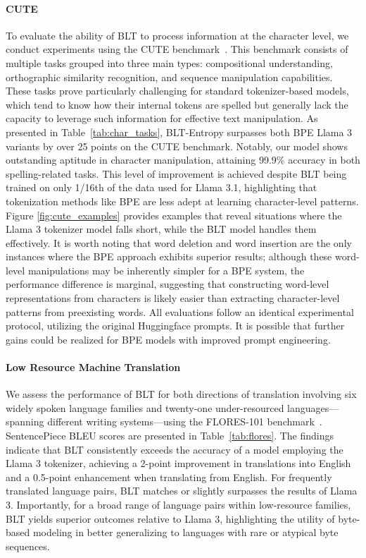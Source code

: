 \paragraph{CUTE}
To evaluate the ability of {\textsc BLT} to process information at the character level, we conduct experiments using the CUTE benchmark~\citep{edman2024cute}. This benchmark consists of multiple tasks grouped into three main types: compositional understanding, orthographic similarity recognition, and sequence manipulation capabilities. These tasks prove particularly challenging for standard tokenizer-based models, which tend to know how their internal tokens are spelled but generally lack the capacity to leverage such information for effective text manipulation. As presented in Table~\ref{tab:char_tasks}, {\textsc BLT}-Entropy surpasses both BPE Llama 3 variants by over 25 points on the CUTE benchmark. Notably, our model shows outstanding aptitude in character manipulation, attaining 99.9\% accuracy in both spelling-related tasks. This level of improvement is achieved despite {\textsc BLT} being trained on only 1/16th of the data used for Llama 3.1, highlighting that tokenization methods like BPE are less adept at learning character-level patterns. Figure \ref{fig:cute_examples} provides examples that reveal situations where the Llama 3 tokenizer model falls short, while the {\textsc BLT} model handles them effectively. It is worth noting that word deletion and word insertion are the only instances where the BPE approach exhibits superior results; although these word-level manipulations may be inherently simpler for a BPE system, the performance difference is marginal, suggesting that constructing word-level representations from characters is likely easier than extracting character-level patterns from preexisting words. All evaluations follow an identical experimental protocol, utilizing the original Huggingface prompts. It is possible that further gains could be realized for BPE models with improved prompt engineering.

\paragraph{Low Resource Machine Translation} We assess the performance of {\textsc BLT} for both directions of translation involving six widely spoken language families and twenty-one under-resourced languages—spanning different writing systems—using the FLORES-101 benchmark~\citep{goyal2022flores}. SentencePiece BLEU scores are presented in Table~\ref{tab:flores}. The findings indicate that {\textsc BLT} consistently exceeds the accuracy of a model employing the Llama 3 tokenizer, achieving a 2-point improvement in translations into English and a 0.5-point enhancement when translating from English. For frequently translated language pairs, {\textsc BLT} matches or slightly surpasses the results of Llama 3. Importantly, for a broad range of language pairs within low-resource families, {\textsc BLT} yields superior outcomes relative to Llama 3, highlighting the utility of byte-based modeling in better generalizing to languages with rare or atypical byte sequences.

